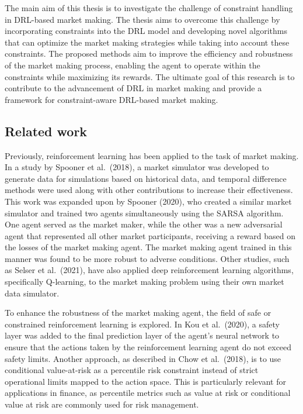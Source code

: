 \documentclass[
  12pt,
  a4paper,
  DIV=11,
  numbers=noendperiod]{scrartcl}
\begin{document}
The main aim of this thesis is to investigate the challenge of
constraint handling in DRL-based market making. The thesis aims to
overcome this challenge by incorporating constraints into the DRL model
and developing novel algorithms that can optimize the market making
strategies while taking into account these constraints. The proposed
methods aim to improve the efficiency and robustness of the market
making process, enabling the agent to operate within the constraints
while maximizing its rewards. The ultimate goal of this research is to
contribute to the advancement of DRL in market making and provide a
framework for constraint-aware DRL-based market making.

\hypertarget{related-work}{%
\subsection{Related work}\label{related-work}}

Previously, reinforcement learning has been applied to the task of
market making. In a study by Spooner et al.~(2018), a market simulator
was developed to generate data for simulations based on historical data,
and temporal difference methods were used along with other contributions
to increase their effectiveness. This work was expanded upon by Spooner
(2020), who created a similar market simulator and trained two agents
simultaneously using the SARSA algorithm. One agent served as the market
maker, while the other was a new adversarial agent that represented all
other market participants, receiving a reward based on the losses of the
market making agent. The market making agent trained in this manner was
found to be more robust to adverse conditions. Other studies, such as
Selser et al.~(2021), have also applied deep reinforcement learning
algorithms, specifically Q-learning, to the market making problem using
their own market data simulator.

To enhance the robustness of the market making agent, the field of safe
or constrained reinforcement learning is explored. In Kou et al.~(2020),
a safety layer was added to the final prediction layer of the agent's
neural network to ensure that the actions taken by the reinforcement
learning agent do not exceed safety limits. Another approach, as
described in Chow et al.~(2018), is to use conditional value-at-risk as
a percentile risk constraint instead of strict operational limits mapped
to the action space. This is particularly relevant for applications in
finance, as percentile metrics such as value at risk or conditional
value at risk are commonly used for risk management.
\end{document}
